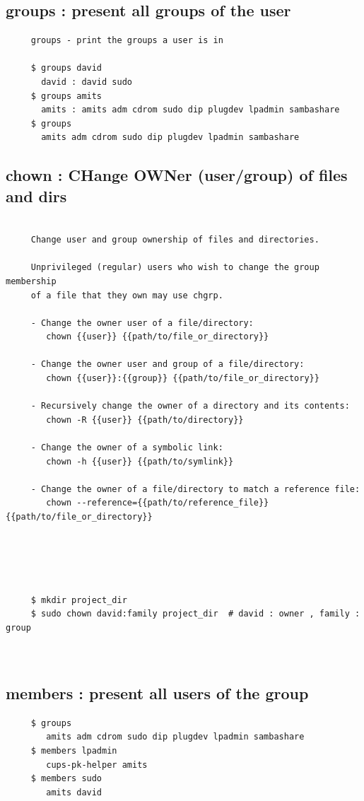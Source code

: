 \documentclass[a4paper,12pt]{article}
\begin{document}
\subsection{groups   : present all groups of the user}
\begin{verbatim}
     groups - print the groups a user is in
       
     $ groups david
       david : david sudo
     $ groups amits
       amits : amits adm cdrom sudo dip plugdev lpadmin sambashare
     $ groups
       amits adm cdrom sudo dip plugdev lpadmin sambashare  

\end{verbatim}

\subsection{chown   : CHange OWNer (user/group) of files and dirs}
\begin{verbatim}
     
     Change user and group ownership of files and directories.
         
     Unprivileged (regular) users who wish to change the group membership
     of a file that they own may use chgrp. 

     - Change the owner user of a file/directory:
        chown {{user}} {{path/to/file_or_directory}}

     - Change the owner user and group of a file/directory:
        chown {{user}}:{{group}} {{path/to/file_or_directory}}

     - Recursively change the owner of a directory and its contents:
        chown -R {{user}} {{path/to/directory}}

     - Change the owner of a symbolic link:
        chown -h {{user}} {{path/to/symlink}}

     - Change the owner of a file/directory to match a reference file:
        chown --reference={{path/to/reference_file}} {{path/to/file_or_directory}}
     
     
     
         
        
     $ mkdir project_dir
     $ sudo chown david:family project_dir  # david : owner , family : group

     
\end{verbatim}




\subsection{members   : present all users of the group}
\begin{verbatim}
     $ groups
        amits adm cdrom sudo dip plugdev lpadmin sambashare
     $ members lpadmin
        cups-pk-helper amits 
     $ members sudo
        amits david
\end{verbatim}
\end{document}

